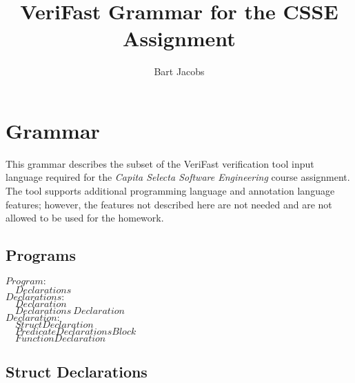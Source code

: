 \documentclass{article}
\title{VeriFast Grammar for the CSSE Assignment}
\author{Bart Jacobs}
\begin{document}
\maketitle

\section{Grammar}

This grammar describes the subset of the VeriFast verification
tool input language required for the \emph{Capita Selecta
Software Engineering} course assignment. The tool supports
additional programming language and annotation language
features; however, the features not described here are not
needed and are not allowed to be used for the homework.

\subsection{Programs}

\begin{flushleft}
$\mathit{Program{:}}$\\
$\quad \mathit{Declarations}$\\[5pt]

$\mathit{Declarations{:}}$\\
$\quad \mathit{Declaration}$\\
$\quad \mathit{Declarations}\ \mathit{Declaration}$\\[5pt]

$\mathit{Declaration{:}}$\\
$\quad \mathit{StructDeclaration}$\\
$\quad \mathit{PredicateDeclarationsBlock}$\\
$\quad \mathit{FunctionDeclaration}$\\
\end{flushleft}

\subsection{Struct Declarations}
\end{document}
